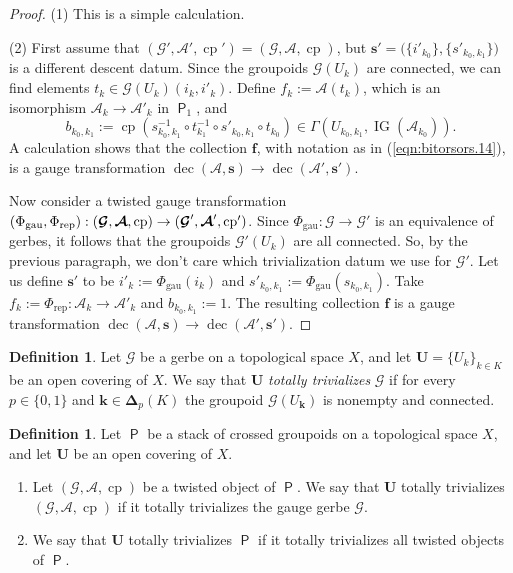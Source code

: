 \documentclass[a4paper, 10pt]{amsart}
\theoremstyle{definition}
\newtheorem{dfn}[equation]{Definition}
\numberwithin{equation}{section}
\newcommand{\opn}{\operatorname}
\newcommand{\cat}[1]{\operatorname{\mathsf{#1}}}
\newcommand{\mcal}[1]{\mathcal{#1}}
\newcommand{\mrm}[1]{\mathrm{#1}}
\newcommand{\bsym}[1]{\boldsymbol{#1}}
\newcommand{\gerbe}[1]{\bsym{\mcal{#1}}}
\newcommand{\twocat}[1]{\operatorname{\bsym{\cat{#1}}}}
\newcommand{\lb}{\linebreak}
\begin{document}
\begin{proof}
(1) This is a simple calculation.

\medskip \noindent
(2) First assume that 
$(\gerbe{G}', \gerbe{A}', \opn{cp}') = 
(\gerbe{G}, \gerbe{A}, \opn{cp})$, 
but 
$\bsym{s}' = \bigl( \{ i'_{k_0} \} , \{ s'_{k_0, k_1} \} \bigr)$ 
is a different descent datum. Since the groupoids 
$\gerbe{G}(U_k)$ are connected, we can find elements 
$t_k \in \gerbe{G}(U_k)(i_k, i'_k)$. 
Define $f_k := \gerbe{A}(t_k)$, which is an isomorphism 
$\mcal{A}_k \to \mcal{A}'_k$ in $\twocat{P}_1$, 
and
\[ b_{k_0, k_1} := \opn{cp}( s_{k_0, k_1}^{-1}  \circ 
t_{k_1}^{-1}  \circ s'_{k_0, k_1}  \circ t_{k_0} ) \in 
\Gamma(U_{k_0, k_1}, \opn{IG}(\mcal{A}_{k_0})) . \]
A calculation shows that the collection $\bsym{f}$, with notation as in 
(\ref{eqn:bitorsors.14}), is a gauge transformation 
$\opn{dec}(\gerbe{A}, \bsym{s}) \to \opn{dec}(\gerbe{A}', \bsym{s}')$.

Now consider a twisted gauge transformation 
$(\Phi_{\mrm{gau}}, \Phi_{\mrm{rep}}) : 
(\gerbe{G}, \gerbe{A}, \opn{cp}) \to \lb (\gerbe{G}', \gerbe{A}', \opn{cp}')$.
Since $\Phi_{\mrm{gau}} : \gerbe{G} \to \gerbe{G}'$
is an equivalence of gerbes, it follows that the groupoids 
$\gerbe{G}'(U_k)$ are all connected. So, by the previous paragraph, we don't
care which trivialization datum we use for $\gerbe{G}'$.
Let us define $\bsym{s}'$ to be 
$i'_k := \Phi_{\mrm{gau}}(i_k)$ and 
$s'_{k_0, k_1} :=  \Phi_{\mrm{gau}}(s_{k_0, k_1})$. 
Take 
$f_k := \Phi_{\mrm{rep}} : \mcal{A}_{k} \to \mcal{A}'_{k}$
and $b_{k_0, k_1} := 1$. 
The resulting collection $\bsym{f}$ is a gauge transformation 
$\opn{dec}(\gerbe{A}, \bsym{s}) \to \opn{dec}(\gerbe{A}', \bsym{s}')$.
\end{proof}

\begin{dfn} \label{dfn:18}
Let $\gerbe{G}$ be a gerbe on a topological space $X$, and let 
$\bsym{U} = \{ U_k \}_{k \in K}$ be an open covering of $X$. We say
that $\bsym{U}$ {\em totally trivializes} $\gerbe{G}$ if 
for every $p \in \{ 0, 1 \}$ and $\bsym{k} \in \bsym{\Delta}_p(K)$ the 
groupoid $\gerbe{G}(U_{\bsym{k}})$ is nonempty and connected.
\end{dfn}

\begin{dfn} \label{dfn:bitorsors.10}
Let $\twocat{P}$ be a stack of crossed groupoids on a topological space $X$,
and let $\bsym{U}$ be an open covering of $X$. 
\begin{enumerate}
\item Let $(\gerbe{G}, \gerbe{A}, \opn{cp})$ be a twisted
object of $\twocat{P}$. We say that $\bsym{U}$ totally trivializes
$(\gerbe{G}, \gerbe{A}, \opn{cp})$ if it totally trivializes the gauge gerbe
$\gerbe{G}$.

\item We say that $\bsym{U}$ totally trivializes 
$\twocat{P}$ if it totally trivializes all twisted objects of $\twocat{P}$.
\end{enumerate}
\end{dfn}
\end{document}
